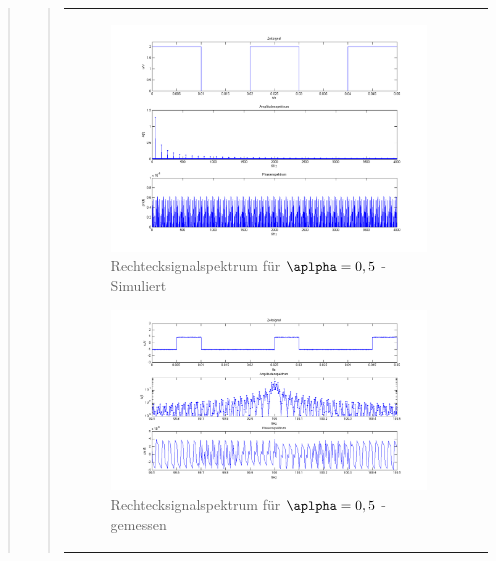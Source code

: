\begin{quote}
\begin{quote}
\begin{center}
\begin{tabular}{ll}
\begin{minipage}{0.6\textwidth}
                    \begin{figure}[H]
                        \label{fig:}
                        \includegraphics[scale=0.25]{./Bilder/recht_alpha5.png} %
                        \caption{Rechtecksignalspektrum für $\aplpha = 0,5$ - Simuliert}
                    \end{figure}

                \end{minipage}
                \begin{minipage}{0.6\textwidth}

                     \begin{figure}[H]
                        \label{fig:}
                        \includegraphics[scale=0.3]{./Bilder/recht_alpha5_-_gemessen.png} %
                        \caption{Rechtecksignalspektrum für $\aplpha = 0,5$ - gemessen}
                    \end{figure}
               \vspace{-1.5em}


\end{minipage}
\end{tabular}
\end{center}
\end{quote}
\end{quote}
